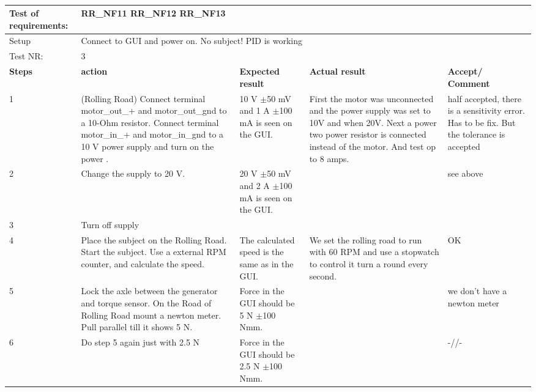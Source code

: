 \begin{table}[h!]
	\centering
	\label{my-label}	
	\begin{tabular}{|p{1.5 cm}|p{4.2 cm}|p{2.1 cm}|p{2.1 cm}|p{2.1 cm}|}
		\hline
		Test of requirements: 
		& \multicolumn{4}{l|}{RR\_NF11 RR\_NF12 RR\_NF13} \\ \hline
		Setup 
		& \multicolumn{4}{l|}{Connect to GUI and power on. No subject! PID is working} \\ \hline
		Test NR:
		& \multicolumn{4}{l|}{3} \\ \hline
		\textbf{Steps} & \textbf{action} & \textbf{Expected result} & 
		\textbf{Actual result} & \textbf{Accept/ Comment} \\ \hline
		1 
		& (Rolling Road) Connect terminal motor\_out\_+ and motor\_out\_gnd to a 10-Ohm resistor. Connect terminal motor\_in\_+ and motor\_in\_gnd to a 10 V power supply and turn on the power .  
		& 10 V $\pm$50 mV and 1 A $\pm$100 mA is seen on the GUI. 
		& First the motor was unconnected and the power supply was set to 10V and when 20V. Next a power two power resistor is connected instead of the motor. And test op to 8 amps. 
		& half accepted, there is a sensitivity error. Has to be fix. But the tolerance is accepted\\ \hline
		2
		& Change the supply to 20 V.
		& 20 V $\pm$50 mV and 2 A $\pm$100 mA is seen on the GUI.
		&
		& see above\\ \hline
		3
		& Turn off supply
		& 
		&
		& \\ \hline
		4
		& Place the subject on the Rolling Road. Start the subject. Use a external RPM counter, and calculate the speed. 
		& The calculated speed is the same as in the GUI.
		& We set the rolling road to run with 60 RPM and use a stopwatch to control it turn a round every second. 
		& OK \\ \hline
		5
		& Lock the axle between the generator and torque sensor. On the Road of Rolling Road mount a newton meter. Pull parallel till it shows 5 N.  
		& Force in the GUI should be 5 N $\pm$100 Nmm.
		&
		& we don't have a newton meter\\ \hline
		6
		& Do step 5 again just with 2.5 N 
		& Force in the GUI should be 2.5 N $\pm$100 Nmm.
		&
		& -//- \\ \hline
	\end{tabular}
	\caption{}
\end{table}


